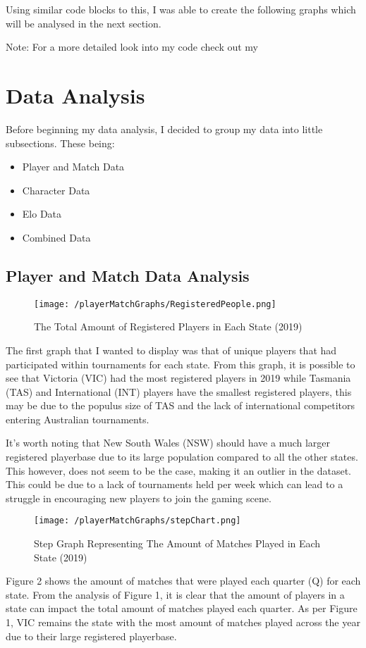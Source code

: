 \documentclass[11pt, oneside, a4paper]{article}
\begin{document}
Using similar code blocks to this, I was able to create the following graphs which will be analysed in the next section.

Note: For a more detailed look into my code check out my %
\newpage

\section{Data Analysis}
Before beginning my data analysis, I decided to group my data into little subsections. These being:
\begin{itemize}
	\item{Player and Match Data}
	\item{Character Data}
	\item{Elo Data}
	\item{Combined Data}
\end{itemize}


\subsection{Player and Match Data Analysis}
\begin{figure}[!ht]
	\centerline{\texttt{[image: /playerMatchGraphs/RegisteredPeople.png]}}
	\caption{The Total Amount of Registered Players in Each State (2019)}
	\label{fig:figure1}
\end{figure}
The first graph that I wanted to display was that of unique players that had participated within tournaments for each state. From this graph, it is possible to see that Victoria (VIC) had the most registered players in 2019 while Tasmania (TAS) and International (INT) players have the smallest registered players, this may be due to the populus size of TAS and the lack of international competitors entering Australian tournaments. 

It's worth noting that New South Wales (NSW) should have a much larger registered playerbase due to its large population compared to all the other states. This however, does not seem to be the case, making it an outlier in the dataset. This could be due to a lack of tournaments held per week which can lead to a struggle in encouraging new players to join the gaming scene.

\newpage

\begin{figure}[!ht]
	\centerline{\texttt{[image: /playerMatchGraphs/stepChart.png]}}
	\caption{Step Graph Representing The Amount of Matches Played in Each State (2019)}
	\label{fig:figure2}
\end{figure}
Figure 2 shows the amount of matches that were played each quarter (Q) for each state. From the analysis of Figure 1, it is clear that the amount of players in a state can impact the total amount of matches played each quarter. As per Figure 1, VIC remains the state with the most amount of matches played across the year due to their large registered playerbase. 
\end{document}
